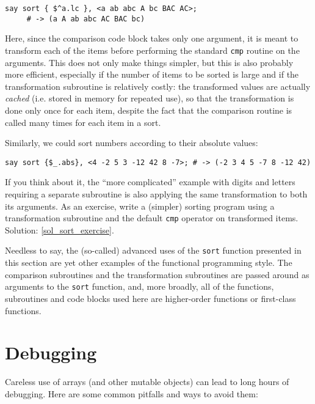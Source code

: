 \begin{verbatim}
say sort { $^a.lc }, <a ab abc A bc BAC AC>;
     # -> (a A ab abc AC BAC bc)
\end{verbatim}

Here, since the comparison code block takes only one 
argument, it is meant to transform each of the items 
before performing the standard {\tt cmp} routine on 
the arguments. This does not only make things simpler, 
but this is also probably more efficient, especially if 
the number of items to be sorted is large and if the 
transformation subroutine is relatively costly: the 
transformed values are actually \emph{cached} (i.e. 
stored in memory for repeated use), so that the 
transformation is done only once for each item, despite 
the fact that the comparison routine is called many times 
for each item in a sort.

Similarly, we could sort numbers according to their 
absolute values:

\begin{verbatim}
say sort {$_.abs}, <4 -2 5 3 -12 42 8 -7>; # -> (-2 3 4 5 -7 8 -12 42)
\end{verbatim}

If you think about it, the ``more complicated'' example 
with digits and letters requiring a separate subroutine 
is also applying the same transformation to both its 
arguments. As an exercise, write a (simpler) sorting 
program using a transformation subroutine and the default 
{\tt cmp} operator on transformed items. Solution: \ref{sol_sort_exercise}.
\label{sort_exercise}

Needless to say, the (so-called) advanced uses of the 
{\tt sort} function presented in this section are yet 
other examples of the functional programming style. The 
comparison subroutines and the transformation subroutines 
are passed around as arguments to the {\tt sort} 
function, and, more broadly, all of the functions, 
subroutines and code blocks used here are higher-order 
functions or first-class functions.

\section{Debugging}

Careless use of arrays (and other mutable objects)
can lead to long hours of debugging.  Here are some common
pitfalls and ways to avoid them:

